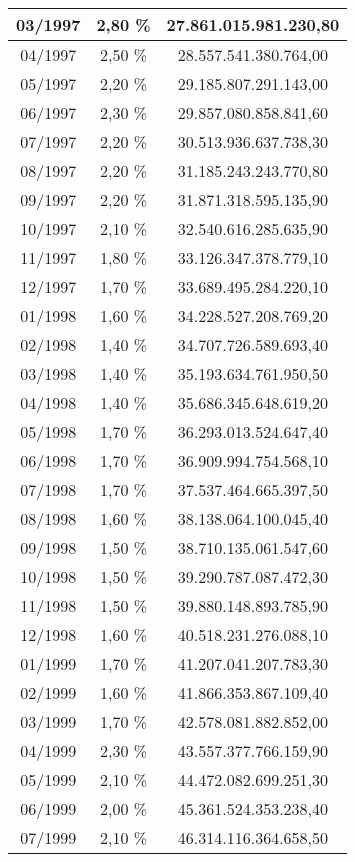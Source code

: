 \begin{center}
\begin{longtable}{|c|c|c|}
03/1997 & 2,80 \% & 27.861.015.981.230,80 \\ \hline
04/1997 & 2,50 \% & 28.557.541.380.764,00 \\ \hline
05/1997 & 2,20 \% & 29.185.807.291.143,00 \\ \hline
06/1997 & 2,30 \% & 29.857.080.858.841,60 \\ \hline
07/1997 & 2,20 \% & 30.513.936.637.738,30 \\ \hline
08/1997 & 2,20 \% & 31.185.243.243.770,80 \\ \hline
09/1997 & 2,20 \% & 31.871.318.595.135,90 \\ \hline
10/1997 & 2,10 \% & 32.540.616.285.635,90 \\ \hline
11/1997 & 1,80 \% & 33.126.347.378.779,10 \\ \hline
12/1997 & 1,70 \% & 33.689.495.284.220,10 \\ \hline
01/1998 & 1,60 \% & 34.228.527.208.769,20 \\ \hline
02/1998 & 1,40 \% & 34.707.726.589.693,40 \\ \hline
03/1998 & 1,40 \% & 35.193.634.761.950,50 \\ \hline
04/1998 & 1,40 \% & 35.686.345.648.619,20 \\ \hline
05/1998 & 1,70 \% & 36.293.013.524.647,40 \\ \hline
06/1998 & 1,70 \% & 36.909.994.754.568,10 \\ \hline
07/1998 & 1,70 \% & 37.537.464.665.397,50 \\ \hline
08/1998 & 1,60 \% & 38.138.064.100.045,40 \\ \hline
09/1998 & 1,50 \% & 38.710.135.061.547,60 \\ \hline
10/1998 & 1,50 \% & 39.290.787.087.472,30 \\ \hline
11/1998 & 1,50 \% & 39.880.148.893.785,90 \\ \hline
12/1998 & 1,60 \% & 40.518.231.276.088,10 \\ \hline
01/1999 & 1,70 \% & 41.207.041.207.783,30 \\ \hline
02/1999 & 1,60 \% & 41.866.353.867.109,40 \\ \hline
03/1999 & 1,70 \% & 42.578.081.882.852,00 \\ \hline
04/1999 & 2,30 \% & 43.557.377.766.159,90 \\ \hline
05/1999 & 2,10 \% & 44.472.082.699.251,30 \\ \hline
06/1999 & 2,00 \% & 45.361.524.353.238,40 \\ \hline
07/1999 & 2,10 \% & 46.314.116.364.658,50 \\ \hline

\end{longtable}
\end{center}
